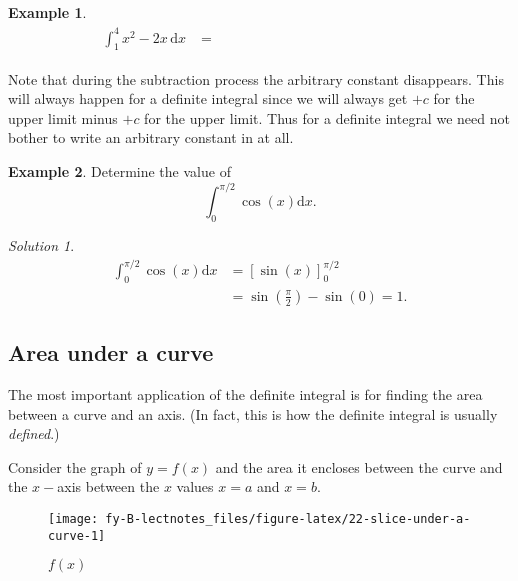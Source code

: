 \documentclass[
  11pt,
  oneside]{book}
\newcommand{\slide}{}
\theoremstyle{definition}
\theoremstyle{definition}
\newtheorem{example}{Example}[chapter]
\theoremstyle{definition}
\theoremstyle{definition}
\theoremstyle{remark}
\newtheorem*{solution}{Solution}
\begin{document}
\begin{slidesonly}

\slide

\begin{example}
\begin{align*}
\int_1^4 x^2-2x\,\mathrm{d}x& = \phantom{\left(\frac{4^3}{3}-4^2+C\right) - \left(\frac{1^3}{3}-1^2+C\right)}
\end{align*}
\end{example}

\vfill

\slide

\end{slidesonly}

Note that during the subtraction process the arbitrary constant disappears. This will always happen for a definite integral since we will always get \(+ c\) for the upper limit minus \(+ c\) for the upper limit. Thus for a definite integral we need not bother to write an arbitrary constant in at all.
\slide

\begin{example}
Determine the value of
\[
\int_0^{\pi/2}\cos(x)\mathrm{d}x.
\]
\end{example}

\begin{solution}
\begin{align*}
\int_0^{\pi/2}\cos(x)\mathrm{d}x& = \left[\sin(x)\right]_0^{\pi/2}\\
&=\sin\left(\frac{\pi}{2}\right)-\sin(0) = 1.
\end{align*}
\end{solution}

\slide

\subsection{Area under a curve}\label{area-under-a-curve}

The most important application of the definite integral is for finding the area between a curve and an axis. (In fact, this is how the definite integral is usually \emph{defined}.)

Consider the graph of \(y = f(x)\) and the area it encloses between the curve and the \(x-\)axis between the \(x\) values \(x = a\) and \(x = b\).

\begin{figure}

{\centering \texttt{[image: fy-B-lectnotes\_files/figure-latex/22-slice-under-a-curve-1]} 

}

\caption{$f(x)$}\label{fig:22-slice-under-a-curve}
\end{figure}
\end{document}
